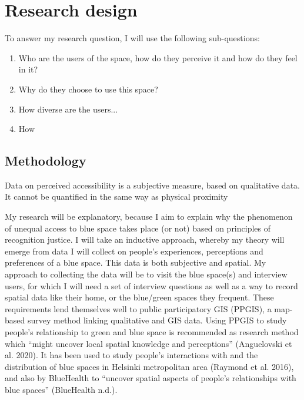 \documentclass{article}
\newcommand{\bisection}[1]{\textbf{\textit{#1}}}
\begin{document}



\section{Research design}

To answer my research question, I will use the following sub-questions:

\begin{enumerate}
	\item Who are the users of the space, how do they perceive it and how do they feel in it?
	\item Why do they choose to use this space?
	\item How diverse are the users... 
	\item How 
\end{enumerate}

\subsection{Methodology}

Data on perceived accessibility is a subjective measure, based on qualitative data. It cannot be quantified in the same way as physical proximity

My research will be explanatory, because I aim to explain why the phenomenon of unequal access to blue space takes place (or not) based on principles of recognition justice. I will take an inductive approach, whereby my theory will emerge from data I will collect on people’s experiences, perceptions and preferences of a blue space. This data is both subjective and spatial. My approach to collecting the data will be to visit the blue space(s) and interview users, for which I will need a set of interview questions as well as a way to record spatial data like their home, or the blue/green spaces they frequent. These requirements lend themselves well to public participatory GIS (PPGIS), a map-based survey method linking qualitative and GIS data. Using PPGIS to study people’s relationship to green and blue space is recommended as research method which “might uncover local spatial knowledge and perceptions” (Anguelovski et al. 2020). It has been used to study people’s interactions with and the distribution of blue spaces in Helsinki metropolitan area (Raymond et al. 2016), and also by BlueHealth to “uncover spatial aspects of people’s relationships with blue spaces” (BlueHealth n.d.).
\end{document}
